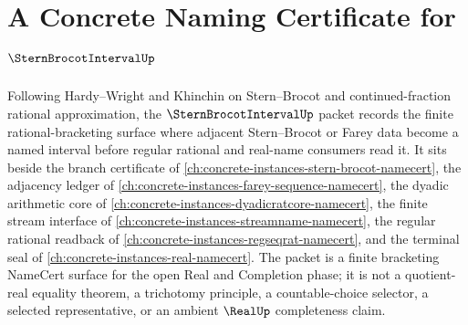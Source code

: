 \chapter{A Concrete Naming Certificate for $\SternBrocotIntervalUp$}
\label{ch:concrete-instances-stern-brocot-interval-namecert}

Following Hardy--Wright and Khinchin on Stern--Brocot and continued-fraction rational approximation, the $\SternBrocotIntervalUp$ packet records the finite rational-bracketing surface where adjacent Stern--Brocot or Farey data become a named interval before regular rational and real-name consumers read it. It sits beside the branch certificate of \autoref{ch:concrete-instances-stern-brocot-namecert}, the adjacency ledger of \autoref{ch:concrete-instances-farey-sequence-namecert}, the dyadic arithmetic core of \autoref{ch:concrete-instances-dyadicratcore-namecert}, the finite stream interface of \autoref{ch:concrete-instances-streamname-namecert}, the regular rational readback of \autoref{ch:concrete-instances-regseqrat-namecert}, and the terminal seal of \autoref{ch:concrete-instances-real-namecert}. The packet is a finite bracketing NameCert surface for the open Real and Completion phase; it is not a quotient-real equality theorem, a trichotomy principle, a countable-choice selector, a selected representative, or an ambient $\RealUp$ completeness claim.

